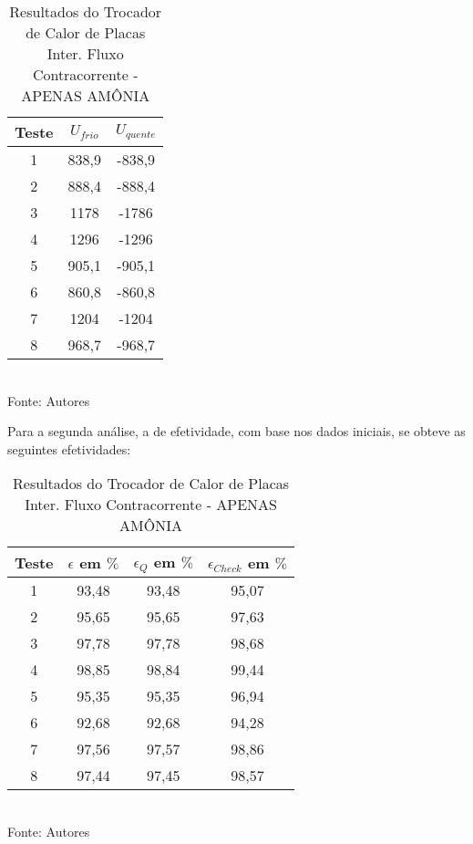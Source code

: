\documentclass[a4paper,12pt,oneside]{article}
\begin{document}
\begin{flushright}
\begin{table}[h]
	\caption{Resultados do Trocador de Calor de Placas Inter. Fluxo Contracorrente - APENAS AMÔNIA}
	\vspace{0.8cm}
	\centering
	\begin{tabular}{| c | c | c |}
		\hline
		Teste & $U_{frio}$ & $U_{quente}$\\
		\hline
		1 & 838,9 & -838,9 \\
		\hline
		2 & 888,4 & -888,4 \\
		\hline
		3 & 1178 & -1786 \\
		\hline
		4 & 1296 & -1296\\
		\hline
		5 & 905,1 & -905,1\\
		\hline
		6 & 860,8 & -860,8 \\
		\hline
		7 & 1204& -1204 \\
		\hline
		8 & 968,7 & -968,7 \\
		\hline
	\end{tabular}\\
	\vspace{0.8cm}
	Fonte: Autores
	\vspace{1cm}
\end{table}

Para a segunda análise, a de efetividade, com base nos dados iniciais, se obteve as seguintes efetividades:
\pagebreak
\clearpage
\newpage

\begin{table}[h]
	\caption{Resultados do Trocador de Calor de Placas Inter. Fluxo Contracorrente - APENAS AMÔNIA}
	\vspace{0.8cm}
	\centering
	\begin{tabular}{| c | c | c | c |}
		\hline
		Teste & $\epsilon$ em $\%$& $\epsilon_{Q}$ em $\%$& $\epsilon_{Check}$ em $\%$ \\
		\hline
		1 &93,48  & 93,48 & 95,07 \\
		\hline
		2 &95,65 & 95,65 & 97,63 \\
		\hline
		3 &97,78 & 97,78 & 98,68\\
		\hline
		4 &98,85 & 98,84 & 99,44\\
		\hline
		5 &95,35 & 95,35 & 96,94\\
		\hline
		6 &92,68 & 92,68 & 94,28\\
		\hline
		7 &97,56 & 97,57 & 98,86\\
		\hline
		8 &97,44 & 97,45 & 98,57\\
		\hline
	\end{tabular}\\
	\vspace{0.8cm}
	Fonte: Autores
	\vspace{1cm}
\end{table}


\end{flushright}
\end{document}

